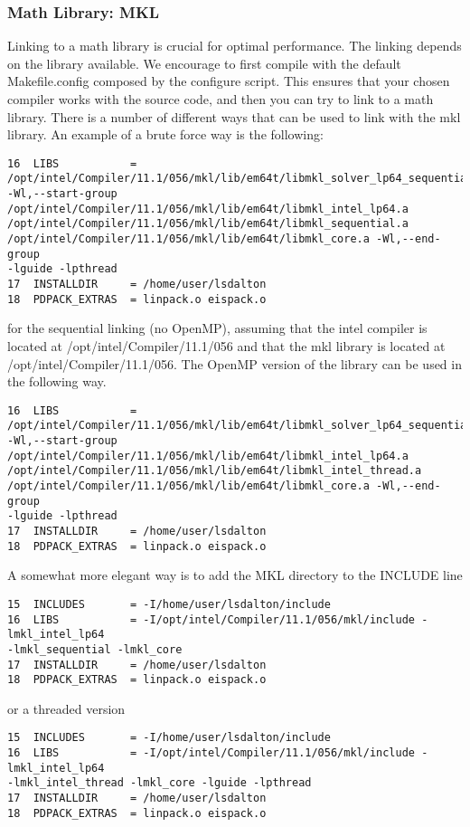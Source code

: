 \subsubsection{Math Library: MKL}\label{mkl:ifort1}
Linking to a math library is crucial for optimal performance. The linking 
depends on the library available. We encourage to first compile with the 
default Makefile.config composed by the configure script. This ensures that 
your chosen compiler works with the {\lsdalton} source code,
and then you can try to link to a math library.
There is a number of different ways that can be used to 
link {\lsdalton} with the mkl library.
An example of a brute force way is the following:
\begin{verbatim}
16  LIBS           = 
/opt/intel/Compiler/11.1/056/mkl/lib/em64t/libmkl_solver_lp64_sequential.a 
-Wl,--start-group /opt/intel/Compiler/11.1/056/mkl/lib/em64t/libmkl_intel_lp64.a 
/opt/intel/Compiler/11.1/056/mkl/lib/em64t/libmkl_sequential.a 
/opt/intel/Compiler/11.1/056/mkl/lib/em64t/libmkl_core.a -Wl,--end-group 
-lguide -lpthread
17  INSTALLDIR     = /home/user/lsdalton
18  PDPACK_EXTRAS  = linpack.o eispack.o
\end{verbatim}
for the sequential linking (no OpenMP), assuming that the intel compiler is 
located at /opt/intel/Compiler/11.1/056 and that the mkl library is located 
at /opt/intel/Compiler/11.1/056.
The OpenMP version of the library can be used in the following way.
\begin{verbatim}
16  LIBS           = 
/opt/intel/Compiler/11.1/056/mkl/lib/em64t/libmkl_solver_lp64_sequential.a 
-Wl,--start-group /opt/intel/Compiler/11.1/056/mkl/lib/em64t/libmkl_intel_lp64.a 
/opt/intel/Compiler/11.1/056/mkl/lib/em64t/libmkl_intel_thread.a 
/opt/intel/Compiler/11.1/056/mkl/lib/em64t/libmkl_core.a -Wl,--end-group 
-lguide -lpthread
17  INSTALLDIR     = /home/user/lsdalton
18  PDPACK_EXTRAS  = linpack.o eispack.o
\end{verbatim}
A somewhat more elegant way is to add the MKL directory to the INCLUDE line 
\begin{verbatim}
15  INCLUDES       = -I/home/user/lsdalton/include
16  LIBS           = -I/opt/intel/Compiler/11.1/056/mkl/include -lmkl_intel_lp64 
-lmkl_sequential -lmkl_core
17  INSTALLDIR     = /home/user/lsdalton
18  PDPACK_EXTRAS  = linpack.o eispack.o
\end{verbatim}
or a threaded version
\begin{verbatim}
15  INCLUDES       = -I/home/user/lsdalton/include
16  LIBS           = -I/opt/intel/Compiler/11.1/056/mkl/include -lmkl_intel_lp64 
-lmkl_intel_thread -lmkl_core -lguide -lpthread
17  INSTALLDIR     = /home/user/lsdalton
18  PDPACK_EXTRAS  = linpack.o eispack.o
\end{verbatim}

